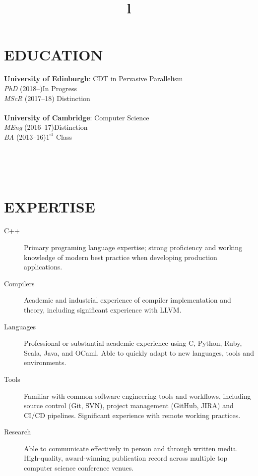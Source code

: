 \documentclass[margin]{res}
\begin{document}
\begin{resume}

\section{EDUCATION}
\textbf{University of Edinburgh}: CDT in Pervasive Parallelism \\
{\sl PhD} (2018--)\hfill In Progress
\\
{\sl MScR} (2017--18)\hfill
Distinction \\\\
\textbf{University of Cambridge}: Computer Science \\
{\sl MEng} (2016--17)\hfill Distinction \\
{\sl BA} (2013--16)\hfill $1^{\mathrm{st}}$ Class

\begin{format}
\title{l}\\
\\
\body\\
\end{format}

\section{EXPERTISE}

\begin{description}
  \item[C++] Primary programing language expertise; strong proficiency and
    working knowledge of modern best practice when developing production
    applications.
  \item[Compilers] Academic and industrial experience of compiler
implementation and theory, including significant experience with LLVM.
  \item[Languages] Professional or substantial academic experience using C,
    Python, Ruby, Scala, Java, and OCaml. Able to quickly adapt to new
    languages, tools and environments.
  \item[Tools] Familiar with common software engineering tools and workflows,
    including source control (Git, SVN), project management (GitHub, JIRA) and
    CI/CD pipelines. Significant experience with remote working practices.
  \item[Research] Able to communicate effectively in person and through written
    media. High-quality, award-winning publication record across multiple top
    computer science conference venues.
\end{description}


\end{resume}
\end{document}
